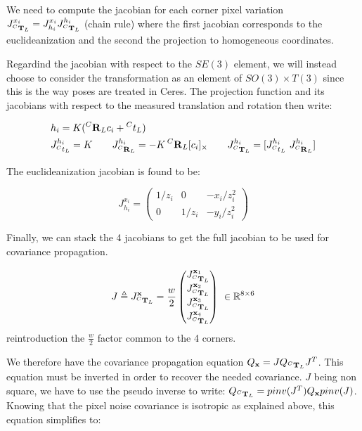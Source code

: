 \documentclass[11pt]{article}
\newcommand{\T}[2]{\prescript{#1}{}{\bfT}_{#2}}
\newcommand{\Rot}[2]{\prescript{#1}{}{\bfR}_{#2}}
\newcommand{\Reals}{\mathbb{R}}
\begin{document}
We need to compute the jacobian for each corner pixel variation $J^{x_i}_{\T{C}{L}} = J^{x_i}_{h_i} J^{h_i}_{\T{C}{L}} $ (chain rule) where the first jacobian corresponds to the euclideanization and the second the projection to homogeneous coordinates.

Regardind the jacobian with respect to the $SE(3)$ element, we will instead choose to consider the transformation as an element of $SO(3)\times T(3)$ since this is the way poses are treated in Ceres. The projection function and its jacobians with respect to the measured translation and rotation then write:

\begin{equation}
\begin{split}
    &h_i = K(\Rot{C}{L}c_i + \prescript{C}{}{t}_L) \\
    &J^{h_i}_{\prescript{C}{}{t}_L} = K ~~~~~~ J^{h_i}_{\Rot{C}{L}} = -K\Rot{C}{L}[c_i]_{\times}  ~~~~~~  J^{h_i}_{\T{C}{L}} = [J^{h_i}_{\prescript{C}{}{t}_L} ~J^{h_i}_{\Rot{C}{L}}]
\end{split}
\end{equation}

The euclideanization jacobian is found to be:

\begin{equation}
    J^{x_i}_{h_i}
    =
    \begin{pmatrix}
    1/z_i & 0 & -x_i/z_i^2 \\
    0 & 1/z_i & -y_i/z_i^2
    \end{pmatrix}
\end{equation}

Finally, we can stack the 4 jacobians to get the full jacobian to be used for covariance propagation.

\begin{equation}
    J \triangleq J^{\bfx}_{\T{C}{L}}=
    \frac{w}{2}
    \begin{pmatrix}
    J^{\bfx_1}_{\T{C}{L}} \\ J^{\bfx_2}_{\T{C}{L}} \\ J^{\bfx_3}_{\T{C}{L}} \\ J^{\bfx_4}_{\T{C}{L}}
    \end{pmatrix}
    ~ \in \Reals^{8 \times 6}
\end{equation}
reintroduction the $\frac{w}{2}$ factor common to the 4 corners. 

We therefore have the covariance propagation equation $Q_{\bfx} = J Q_{\T{C}{L}} J^T$. This equation must be inverted in order to recover the needed covariance. $J$ being non square, we have to use the pseudo inverse to write: $Q_{\T{C}{L}} = pinv(J^T) Q_{\bfx} pinv(J)$. Knowing that the pixel noise covariance is isotropic as explained above, this equation simplifies to:
\end{document}
